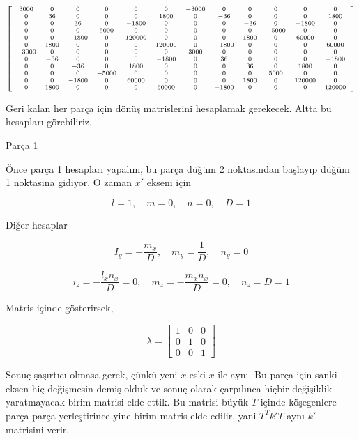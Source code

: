 \documentclass[12pt,fleqn]{article}\usepackage{../../common}
\begin{document}
$$
{\scriptsize
\left[\begin{array}{cccccccccccc}3000 & 0 & 0 & 0 & 0 & 0 & -3000 & 0 & 0 & 0 & 0 & 0\\0 & 36 & 0 & 0 & 0 & 1800 & 0 & -36 & 0 & 0 & 0 & 1800\\0 & 0 & 36 & 0 & -1800 & 0 & 0 & 0 & -36 & 0 & -1800 & 0\\0 & 0 & 0 & 5000 & 0 & 0 & 0 & 0 & 0 & -5000 & 0 & 0\\0 & 0 & -1800 & 0 & 120000 & 0 & 0 & 0 & 1800 & 0 & 60000 & 0\\0 & 1800 & 0 & 0 & 0 & 120000 & 0 & -1800 & 0 & 0 & 0 & 60000\\-3000 & 0 & 0 & 0 & 0 & 0 & 3000 & 0 & 0 & 0 & 0 & 0\\0 & -36 & 0 & 0 & 0 & -1800 & 0 & 36 & 0 & 0 & 0 & -1800\\0 & 0 & -36 & 0 & 1800 & 0 & 0 & 0 & 36 & 0 & 1800 & 0\\0 & 0 & 0 & -5000 & 0 & 0 & 0 & 0 & 0 & 5000 & 0 & 0\\0 & 0 & -1800 & 0 & 60000 & 0 & 0 & 0 & 1800 & 0 & 120000 & 0\\0 & 1800 & 0 & 0 & 0 & 60000 & 0 & -1800 & 0 & 0 & 0 & 120000\end{array}\right]
}
$$

Geri kalan her parça için dönüş matrislerini hesaplamak gerekecek. Altta bu
hesapları görebiliriz.

Parça 1

Önce parça 1 hesapları yapalım, bu parça düğüm 2 noktasından başlayıp
düğüm 1 noktasına gidiyor. O zaman $x'$ ekseni için

$$
l = 1, \quad m = 0, \quad n = 0, \quad D = 1
$$

Diğer hesaplar

$$
I_y = -\frac{m_x}{D}, \quad
m_y = \frac{1}{D}, \quad
n_y = 0
$$

$$
i_z = -\frac{l_x n_x}{D} = 0, \quad
m_z = -\frac{m_x n_x}{D} = 0, \quad
n_z = D = 1
$$

Matris içinde gösterirsek,

$$
\lambda = \left[\begin{array}{ccc}
1 & 0 & 0 \\ 0 & 1 & 0 \\ 0 & 0 & 1
\end{array}\right]
$$

Sonuç şaşırtıcı olmasa gerek, çünkü yeni $x$ eski $x$ ile aynı. Bu parça için
sanki eksen hiç değişmesin demiş olduk ve sonuç olarak çarpılınca hiçbir
değişiklik yaratmayacak birim matrisi elde ettik. Bu matrisi büyük $T$ içinde
köşegenlere parça parça yerleştirince yine birim matris elde edilir, yani
$T^T k'T$ aynı $k'$ matrisini verir.
\end{document}
